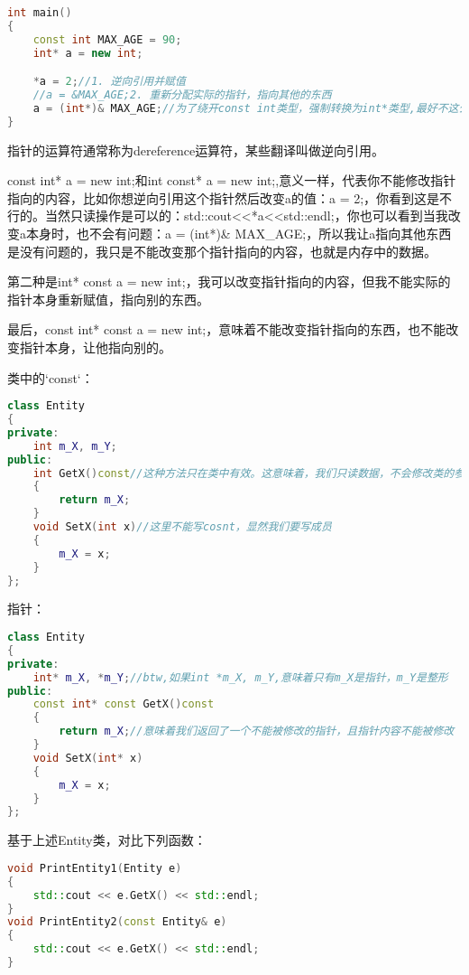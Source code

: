 \begin{lstlisting}[language=c++]
int main()
{
    const int MAX_AGE = 90;
    int* a = new int;

    *a = 2;//1. 逆向引用并赋值
    //a = &MAX_AGE;2. 重新分配实际的指针，指向其他的东西
    a = (int*)& MAX_AGE;//为了绕开const int类型，强制转换为int*类型,最好不这么做
}
\end{lstlisting}


指针的{\ncodestyle *}运算符通常称为{\ncodestyle dereference}运算符，某些翻译叫做逆向引用。

{\ncodestyle const int* a = new int;}和{\ncodestyle int const* a = new int;},意义一样，代表你不能修改指针指向的内容，比如你想逆向引用这个指针然后改变{\ncodestyle a}的值：{\ncodestyle *a = 2;}，你看到这是不行的。当然只读操作是可以的：{\ncodestyle std::cout<<*a<<std::endl;}，你也可以看到当我改变{\ncodestyle a}本身时，也不会有问题：{\ncodestyle a = (int*)\& MAX_AGE;}，所以我让{\ncodestyle a}指向其他东西是没有问题的，我只是不能改变那个指针指向的内容，也就是内存中的数据。

第二种是{\ncodestyle int* const a = new int;}，我可以改变指针指向的内容，但我不能实际的指针本身重新赋值，指向别的东西。

最后，{\ncodestyle const int* const a = new int;}，意味着不能改变指针指向的东西，也不能改变指针本身，让他指向别的。


类中的`const`：

\begin{lstlisting}[language=c++]
class Entity
{
private:
    int m_X, m_Y;
public:
    int GetX()const//这种方法只在类中有效。这意味着，我们只读数据，不会修改类的参数，所以在get函数后写const是有意义的(make sense)
    {
        return m_X;
    }
    void SetX(int x)//这里不能写cosnt，显然我们要写成员
    {
        m_X = x;
    }
};
\end{lstlisting}


指针：

\begin{lstlisting}[language=c++]
class Entity
{
private:
    int* m_X, *m_Y;//btw,如果int *m_X, m_Y,意味着只有m_X是指针，m_Y是整形
public:
    const int* const GetX()const
    {
        return m_X;//意味着我们返回了一个不能被修改的指针，且指针内容不能被修改
    }
    void SetX(int* x)
    {
        m_X = x;
    }
};
\end{lstlisting}


基于上述{\ncodestyle Entity}类，对比下列函数：

\begin{lstlisting}[language=c++]
void PrintEntity1(Entity e)
{
    std::cout << e.GetX() << std::endl;
}
void PrintEntity2(const Entity& e)
{
    std::cout << e.GetX() << std::endl;
}
\end{lstlisting}

